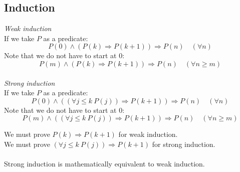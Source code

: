 \documentclass{scrartcl}
\begin{document}
\subsection{Induction}
\textit{Weak induction}
\\
If we take $ P $ as a predicate:
\begin{equation}
P(0) \land (P(k) \Rightarrow P(k+1)) \Rightarrow P(n) \quad (\forall n)
\end{equation}
Note that we do not have to start at 0:
\begin{equation}
P(m) \land (P(k) \Rightarrow P(k+1)) \Rightarrow P(n) \quad (\forall n \geq m)
\end{equation}
\\
\textit{Strong induction}
\\
If we take $ P $ as a predicate:
\begin{equation}
P(0) \land ((\forall j \leq k \ P(j)) \Rightarrow P(k+1)) \Rightarrow P(n) \quad (\forall n)
\end{equation}
Note that we do not have to start at 0:
\begin{equation}
P(m) \land ((\forall j \leq k \ P(j)) \Rightarrow P(k+1)) \Rightarrow P(n) \quad (\forall n \geq m)
\end{equation}
\begin{tcolorbox}[breakable]
We must prove $ P(k) \Rightarrow P(k+1) $ for weak induction.
\\
We must prove $ (\forall j \leq k \ P(j)) \Rightarrow P(k+1) $ for strong induction.
\\\\
Strong induction is mathematically equivalent to weak induction.
\end{tcolorbox}
\end{document}
